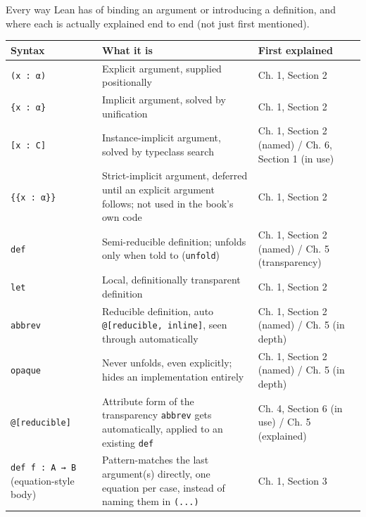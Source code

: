 Every way Lean has of binding an argument or introducing a definition, and where each is actually explained end to end (not just first mentioned).

\begin{longtable}[]{@{}
  >{\raggedright\arraybackslash}p{}
  >{\raggedright\arraybackslash}p{}
  >{\raggedright\arraybackslash}p{}@{}}
\toprule\noalign{}
\begin{minipage}[b]{\linewidth}\raggedright
Syntax
\end{minipage} & \begin{minipage}[b]{\linewidth}\raggedright
What it is
\end{minipage} & \begin{minipage}[b]{\linewidth}\raggedright
First explained
\end{minipage} \\
\midrule\noalign{}
\endhead
\bottomrule\noalign{}
\endlastfoot
\texttt{(x : α)} & Explicit argument, supplied positionally & Ch. 1, Section 2 \\
\texttt{\{x : α\}} & Implicit argument, solved by unification & Ch. 1, Section 2 \\
\texttt{[x : C]} & Instance-implicit argument, solved by typeclass search & Ch. 1, Section 2 (named) / Ch. 6, Section 1 (in use) \\
\texttt{\{\{x : α\}\}} & Strict-implicit argument, deferred until an explicit argument follows; not used in the book's own code & Ch. 1, Section 2 \\
\texttt{def} & Semi-reducible definition; unfolds only when told to (\texttt{unfold}) & Ch. 1, Section 2 (named) / Ch. 5 (transparency) \\
\texttt{let} & Local, definitionally transparent definition & Ch. 1, Section 2 \\
\texttt{abbrev} & Reducible definition, auto \texttt{@[reducible, inline]}, seen through automatically & Ch. 1, Section 2 (named) / Ch. 5 (in depth) \\
\texttt{opaque} & Never unfolds, even explicitly; hides an implementation entirely & Ch. 1, Section 2 (named) / Ch. 5 (in depth) \\
\texttt{@[reducible]} & Attribute form of the transparency \texttt{abbrev} gets automatically, applied to an existing \texttt{def} & Ch. 4, Section 6 (in use) / Ch. 5 (explained) \\
\texttt{def f : A → B} (equation-style body) & Pattern-matches the last argument(s) directly, one equation per case, instead of naming them in \texttt{(...)} & Ch. 1, Section 3 \\
\end{longtable}

